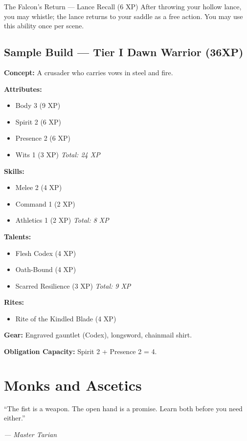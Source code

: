 \documentclass[9pt,a5paper]{extbook}
\begin{document}
\begin{talentbox}{The Falcon's Return --- Lance Recall (6 XP)}
After throwing your hollow lance, you may whistle; the lance returns to your saddle as a free action. You may use this ability once per scene.
\end{talentbox}

\section{Sample Build --- Tier I Dawn Warrior (36XP)}

\textbf{Concept:} A crusader who carries vows in steel and fire.

\noindent
\textbf{Attributes:}
\begin{itemize}
    \item Body 3 (9 XP)
    \item Spirit 2 (6 XP)
    \item Presence 2 (6 XP)
    \item Wits 1 (3 XP) \hfill \textit{Total: 24 XP}
\end{itemize}

\noindent
\textbf{Skills:}
\begin{itemize}
    \item Melee 2 (4 XP)
    \item Command 1 (2 XP)
    \item Athletics 1 (2 XP) \hfill \textit{Total: 8 XP}
\end{itemize}

\noindent
\textbf{Talents:}
\begin{itemize}
    \item Flesh Codex (4 XP)
    \item Oath-Bound (4 XP)
    \item Scarred Resilience (3 XP) \hfill \textit{Total: 9 XP}
\end{itemize}

\noindent
\textbf{Rites:}
\begin{itemize}
    \item Rite of the Kindled Blade (4 XP)
\end{itemize}

\noindent
\textbf{Gear:} Engraved gauntlet (Codex), longsword, chainmail shirt.

\noindent
\textbf{Obligation Capacity:} Spirit 2 + Presence 2 = 4.

\clearpage

\chapter{Monks and Ascetics}
\epigraph{``The fist is a weapon. The open hand is a promise. Learn both before you need either.''}{\textit{--- Master Tarian}}
\end{document}
